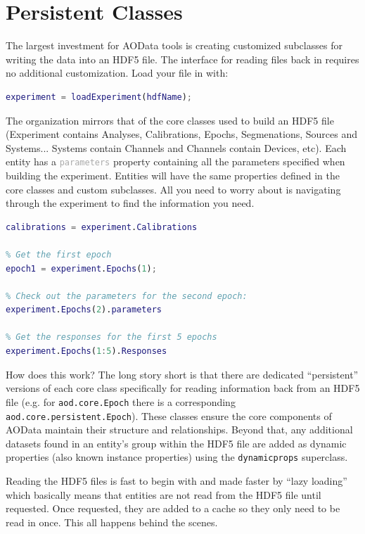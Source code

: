 \documentclass[10pt]{exam}
\newcommand\aodclass[1]{\textcolor{codeblue}{\texttt{#1}}}
\newcommand\matclass[1]{\textcolor{codeblue}{\texttt{#1}}}
\newcommand\aodprop[1]{\textcolor{darkgray}{\texttt{#1}}}
\begin{document}
\section{Persistent Classes}
	\label{section:PersistentClasses}
	\noindent The largest investment for AOData tools is creating customized subclasses for writing the data into an HDF5 file. The interface for reading files back in requires no additional customization. Load your file in with:
	\begin{lstlisting}[language=matlab]
experiment = loadExperiment(hdfName);
	\end{lstlisting}
	The organization mirrors that of the core classes used to build an HDF5 file (Experiment contains Analyses, Calibrations, Epochs, Segmenations, Sources and Systems... Systems contain Channels and Channels contain Devices, etc). Each entity has a \aodprop{parameters} property containing all the parameters specified when building the experiment. Entities will have the same properties defined in the core classes and custom subclasses. All you need to worry about is navigating through the experiment to find the information you need.
	\begin{lstlisting}[language=matlab]
% Get all the calibrations
calibrations = experiment.Calibrations

% Get the first epoch
epoch1 = experiment.Epochs(1);

% Check out the parameters for the second epoch:
experiment.Epochs(2).parameters

% Get the responses for the first 5 epochs
experiment.Epochs(1:5).Responses 
	\end{lstlisting}
	How does this work? The long story short is that there are dedicated ``persistent'' versions of each core class specifically for reading information back from an HDF5 file (e.g. for \aodclass{aod.core.Epoch} there is a corresponding \aodclass{aod.core.persistent.Epoch}). These classes ensure the core components of AOData maintain their structure and relationships. Beyond that, any additional datasets found in an entity's group within the HDF5 file are added as dynamic properties (also known instance properties) using the \matclass{dynamicprops} superclass.   
	
	Reading the HDF5 files is fast to begin with and made faster by ``lazy loading'' which basically means that entities are not read from the HDF5 file until requested. Once requested, they are added to a cache so they only need to be read in once. This all happens behind the scenes.
	
\end{document}
